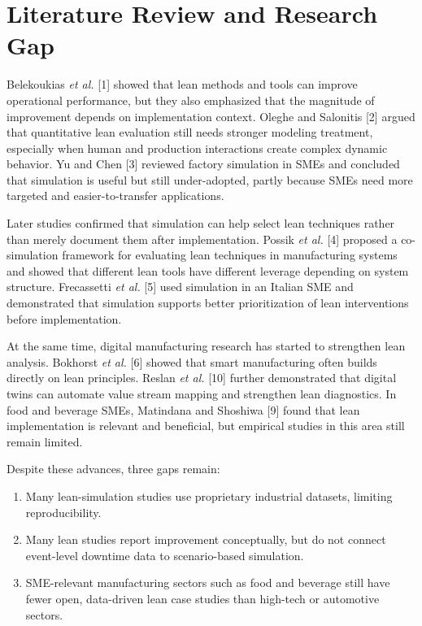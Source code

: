 \documentclass[journal]{IEEEtran}
\begin{document}
\section{Literature Review and Research Gap}
Belekoukias \emph{et al.} [1] showed that lean methods and tools can improve operational performance, but they also emphasized that the magnitude of improvement depends on implementation context. Oleghe and Salonitis [2] argued that quantitative lean evaluation still needs stronger modeling treatment, especially when human and production interactions create complex dynamic behavior. Yu and Chen [3] reviewed factory simulation in SMEs and concluded that simulation is useful but still under-adopted, partly because SMEs need more targeted and easier-to-transfer applications.

Later studies confirmed that simulation can help select lean techniques rather than merely document them after implementation. Possik \emph{et al.} [4] proposed a co-simulation framework for evaluating lean techniques in manufacturing systems and showed that different lean tools have different leverage depending on system structure. Frecassetti \emph{et al.} [5] used simulation in an Italian SME and demonstrated that simulation supports better prioritization of lean interventions before implementation.

At the same time, digital manufacturing research has started to strengthen lean analysis. Bokhorst \emph{et al.} [6] showed that smart manufacturing often builds directly on lean principles. Reslan \emph{et al.} [10] further demonstrated that digital twins can automate value stream mapping and strengthen lean diagnostics. In food and beverage SMEs, Matindana and Shoshiwa [9] found that lean implementation is relevant and beneficial, but empirical studies in this area still remain limited.

Despite these advances, three gaps remain:
\begin{enumerate}
    \item Many lean-simulation studies use proprietary industrial datasets, limiting reproducibility.
    \item Many lean studies report improvement conceptually, but do not connect event-level downtime data to scenario-based simulation.
    \item SME-relevant manufacturing sectors such as food and beverage still have fewer open, data-driven lean case studies than high-tech or automotive sectors.
\end{enumerate}
\end{document}
